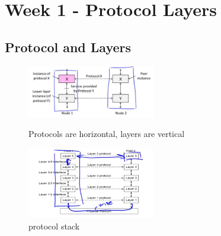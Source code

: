 \documentclass[12pt]{ctexart}   %
\begin{document}
\section{Week 1 - Protocol Layers}
	\subsection{Protocol and Layers}
	
	\begin{figure}
		\begin{minipage}[t]{0.5\linewidth}
			\centering
			\includegraphics[width=2.2in]{images/1-6-1}
			\caption{Protocols are horizontal, layers are vertical }
			\label{fig:1-6-1}
		\end{minipage}
		\begin{minipage}[t]{0.5\linewidth}
			\centering
			\includegraphics[width=2.2in]{images/1-6-2}
			\caption{protocol stack}
			\label{fig:1-6-2}
		\end{minipage}
	\end{figure}
		
\end{document}
